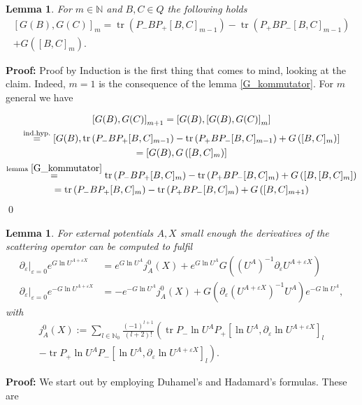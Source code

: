 \documentclass[b5paper,draft,openbib,12pt]{memoir}
\newtheorem{Lemma}[Def]{Lemma}
\DeclareMathOperator{\tr}{tr}
\begin{document}
\begin{Lemma}\label{nested_kommuted_G}
For \(m\in\mathbb{N}\) and \(B,C \in Q\) the following holds
\begin{multline}
\left[ G(B),G(C)\right]_m=  \tr\left(P_-BP_+[B,C]_{m-1}\right) - \tr\left(P_+BP_-[B,C]_{m-1}\right)\\
+G\left([B,C]_m\right) .
\end{multline}
\end{Lemma}
\textbf{Proof:} Proof by Induction is the first thing that comes to mind, looking at the claim. Indeed, \(m=1\) is the consequence
of the lemma \ref{G_kommutator}. For \(m\) general we have

\begin{multline}
\left[ G(B),G(C)\right]_{m+1}
=\left[ G(B),\left[ G(B),G(C)\right]_{m}\right]\\
\stackrel{\text{ind.hyp.}}{=}\left[ G(B), \tr\left(P_-BP_+[B,C]_{m-1}\right) - \tr\left(P_+BP_-[B,C]_{m-1}\right)
+G\left([B,C]_m\right) \right]\\
=\left[ G(B),G\left([B,C]_m\right) \right]\\
\stackrel{\text{lemma } \ref{G_kommutator}}{=} 
\tr\left(P_- B P_+ [B,C]_m\right)
-\tr\left(P_+BP_- [B,C]_m \right) 
+G\left(\left[B,[B,C]_m\right]\right)\\
=
\tr\left(P_- B P_+ [B,C]_m\right)
-\tr\left(P_+BP_- [B,C]_m \right) 
+G\left([B,C]_{m+1}\right)
\end{multline}
\qed 

\begin{Lemma}\label{lemma:derivativeJ}
For external potentials \(A, X\) small enough the derivatives of the scattering operator can be computed to fulfil
\begin{align}\label{eq:derivativeS1}
\partial_\varepsilon |_{\varepsilon=0} e^{G \ln U^{A+\varepsilon X}} &= e^{G \ln U^A} j_A^0(X) + e^{G \ln U^A} G( (U^A)^{-1} \partial_{\varepsilon} U^{A+\varepsilon X})\\
\partial_\varepsilon |_{\varepsilon=0} e^{-G \ln U^{A+\varepsilon X}} &=- e^{-G \ln U^A} j_A^0(X) + G( \partial_{\varepsilon} \left(U^{A+\varepsilon X}\right)^{-1} U^A ) e^{-G \ln U^A},
\end{align}
with 
\begin{multline}\label{def:vacuumExpectationCurrent}
j^0_A(X):= \sum_{l\in\mathbb{N}_0} \frac{(-1)^{l+1}}{(l+2)!} \left(\tr P_- \ln U^A P_+ \left[ \ln U^A, \partial_\varepsilon \ln U^{A+\varepsilon X}\right]_{l}\right.\\
\left. - \tr P_+ \ln U^A P_- \left[ \ln U^A, \partial_\varepsilon \ln U^{A+\varepsilon X}\right]_{l} \right).
\end{multline}
\end{Lemma}
\textbf{Proof:} We start out by employing Duhamel's and Hadamard's formulas. 
These are
\end{document}
